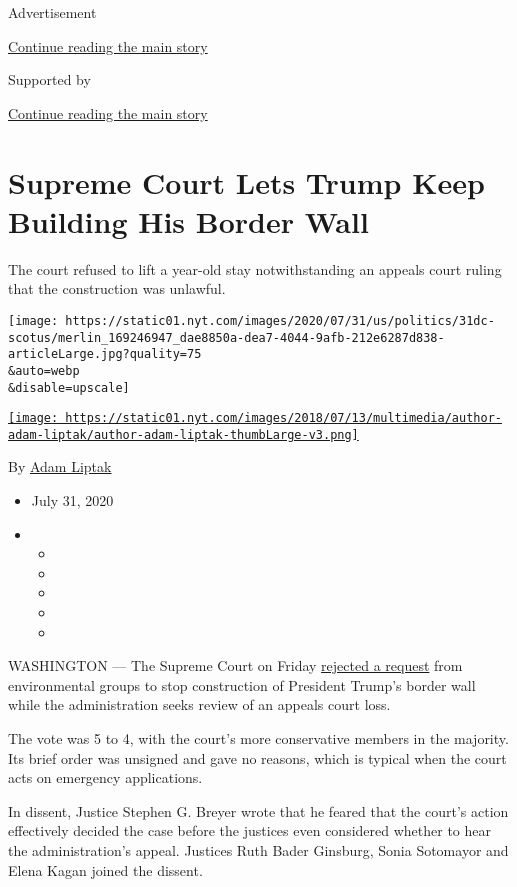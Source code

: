 Advertisement

\protect\hyperlink{after-top}{Continue reading the main story}

Supported by

\protect\hyperlink{after-sponsor}{Continue reading the main story}

\hypertarget{supreme-court-lets-trump-keep-building-his-border-wall}{%
\section{Supreme Court Lets Trump Keep Building His Border
Wall}\label{supreme-court-lets-trump-keep-building-his-border-wall}}

The court refused to lift a year-old stay notwithstanding an appeals
court ruling that the construction was unlawful.

\texttt{[image: https://static01.nyt.com/images/2020/07/31/us/politics/31dc-scotus/merlin\_169246947\_dae8850a-dea7-4044-9afb-212e6287d838-articleLarge.jpg?quality=75\\\&auto=webp\\\&disable=upscale]}

\href{https://www.nytimes.com/by/adam-liptak}{\texttt{[image: https://static01.nyt.com/images/2018/07/13/multimedia/author-adam-liptak/author-adam-liptak-thumbLarge-v3.png]}}

By \href{https://www.nytimes.com/by/adam-liptak}{Adam Liptak}

\begin{itemize}
\item
  July 31, 2020
\item
  \begin{itemize}
  \item
  \item
  \item
  \item
  \item
  \end{itemize}
\end{itemize}

WASHINGTON --- The Supreme Court on Friday
\href{https://www.supremecourt.gov/opinions/19pdf/19a60_bqm1.pdf}{rejected
a request} from environmental groups to stop construction of President
Trump's border wall while the administration seeks review of an appeals
court loss.

The vote was 5 to 4, with the court's more conservative members in the
majority. Its brief order was unsigned and gave no reasons, which is
typical when the court acts on emergency applications.

In dissent, Justice Stephen G. Breyer wrote that he feared that the
court's action effectively decided the case before the justices even
considered whether to hear the administration's appeal. Justices Ruth
Bader Ginsburg, Sonia Sotomayor and Elena Kagan joined the dissent.

